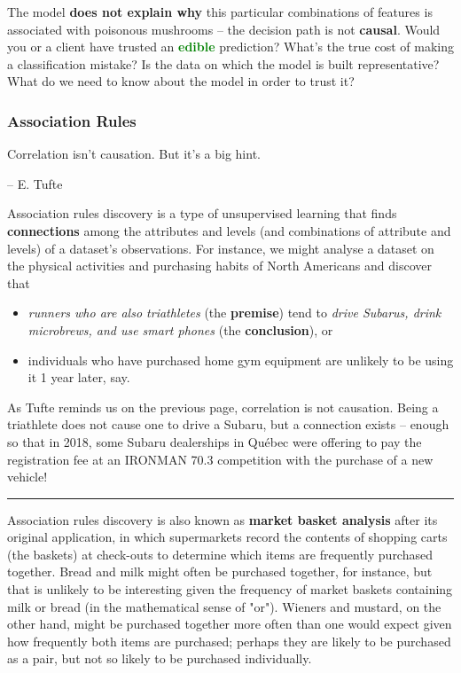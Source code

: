 The model \textbf{does not explain why} this particular combinations of features is associated with poisonous mushrooms -- the decision path is not \textbf{causal}. Would you or a client have trusted an \textbf{\textcolor{Green}{edible}} prediction? What's the true cost of making a classification mistake? Is the data on which the model is built representative? What do we need to know about the model in order to trust it? 


\subsubsection{Association Rules}
\begin{tcolorbox}[title=Tufte's Rejoinder]
Correlation isn't causation. But it's a big hint. \\[-0.6cm]
\begin{flushright}
-- E. Tufte
\end{flushright}
\end{tcolorbox}
\noindent Association rules discovery is a type of unsupervised learning that finds \textbf{connections} among the attributes and levels (and combinations of attribute and levels) of a dataset's observations.
\newl For instance, we might analyse a dataset on the physical activities and purchasing habits of North Americans and discover that 
\begin{itemize}[noitemsep]
\item \textit{runners who are also triathletes} (the \textbf{premise}) tend to \textit{drive Subarus, drink microbrews, and use smart phones} (the \textbf{conclusion}), or 
\item individuals who have purchased home gym equipment are unlikely to be using it 1 year later, say. 
\end{itemize}
As Tufte reminds us on the previous page, correlation is not causation. Being a triathlete does not cause one to drive a Subaru, but a connection exists -- enough so that in 2018, some Subaru dealerships in Qu\'ebec were offering to pay the registration fee at an IRONMAN 70.3 competition with the purchase of a new vehicle! 
\begin{center}
    \rule{0.5\textwidth}{.4pt}
\end{center}
Association rules discovery is also known as \textbf{market basket analysis} after its original application, in which supermarkets record the contents of shopping carts (the baskets) at check-outs to determine which items are frequently purchased together. Bread and milk might often be purchased together, for instance, but that is unlikely to be interesting given the frequency of market baskets containing milk or bread (in the mathematical sense of "or"). Wieners and mustard, on the other hand, might be purchased together more often than one would expect given how frequently both items are purchased; perhaps they are likely to be purchased as a pair, but not so likely to be purchased individually. 
